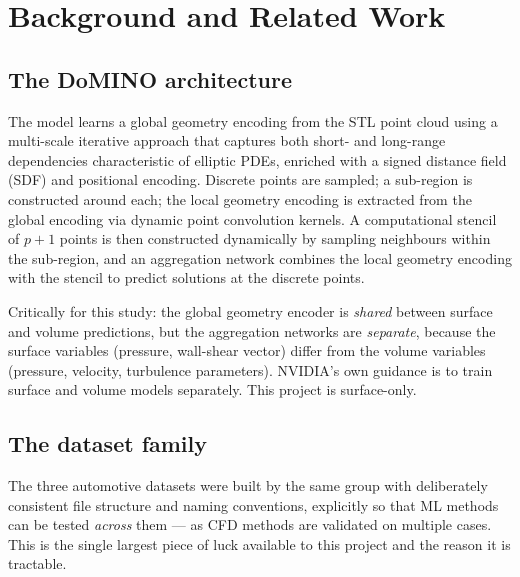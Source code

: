 \documentclass[10pt,a4paper]{article}
\theoremstyle{definition}
\begin{document}
\section{Background and Related Work}

\subsection{The DoMINO architecture}

The model learns a global geometry encoding from the STL point cloud using a
multi-scale iterative approach that captures both short- and long-range
dependencies characteristic of elliptic PDEs, enriched with a signed distance
field (SDF) and positional encoding. Discrete points are sampled; a sub-region is
constructed around each; the local geometry encoding is extracted from the global
encoding via dynamic point convolution kernels. A computational stencil of $p+1$
points is then constructed dynamically by sampling neighbours within the
sub-region, and an aggregation network combines the local geometry encoding with
the stencil to predict solutions at the discrete points.

Critically for this study: the global geometry encoder is \emph{shared} between
surface and volume predictions, but the aggregation networks are \emph{separate},
because the surface variables (pressure, wall-shear vector) differ from the volume
variables (pressure, velocity, turbulence parameters). NVIDIA's own guidance is to
train surface and volume models separately. This project is surface-only.

\subsection{The dataset family}

The three automotive datasets were built by the same group with deliberately
consistent file structure and naming conventions, explicitly so that ML methods
can be tested \emph{across} them --- as CFD methods are validated on multiple
cases. This is the single largest piece of luck available to this project and the
reason it is tractable.
\end{document}
